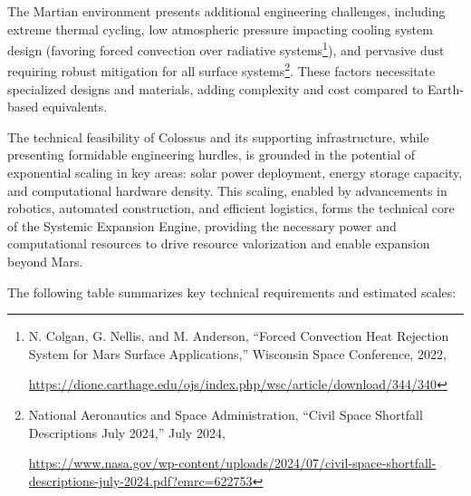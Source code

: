 \documentclass[fontsize=10pt, oneside, DIV=calc]{scrartcl}
\begin{document}
\noindent
The Martian environment presents additional engineering challenges, including extreme thermal cycling, low atmospheric pressure impacting cooling system design (favoring forced convection over radiative systems\footnote{N. Colgan, G. Nellis, and M. Anderson, ``Forced Convection Heat Rejection System for Mars Surface Applications,'' Wisconsin Space Conference, 2022,








\href{https://dione.carthage.edu/ojs/index.php/wsc/article/download/344/340}\url{https://dione.carthage.edu/ojs/index.php/wsc/article/download/344/340}}), and pervasive dust requiring robust mitigation for all surface systems\footnote{National Aeronautics and Space Administration, ``Civil Space Shortfall Descriptions July 2024,'' July 2024,








\href{https://www.nasa.gov/wp-content/uploads/2024/07/civil-space-shortfall-descriptions-july-2024.pdf?emrc=622753}\url{https://www.nasa.gov/wp-content/uploads/2024/07/civil-space-shortfall-descriptions-july-2024.pdf?emrc=622753}}. These factors necessitate specialized designs and materials, adding complexity and cost compared to Earth-based equivalents.

\medskip

\noindent
The technical feasibility of Colossus and its supporting infrastructure, while presenting formidable engineering hurdles, is grounded in the potential of exponential scaling in key areas: solar power deployment, energy storage capacity, and computational hardware density. This scaling, enabled by advancements in robotics, automated construction, and efficient logistics, forms the technical core of the Systemic Expansion Engine, providing the necessary power and computational resources to drive resource valorization and enable expansion beyond Mars.

\medskip

\noindent
The following table summarizes key technical requirements and estimated scales:
\end{document}

